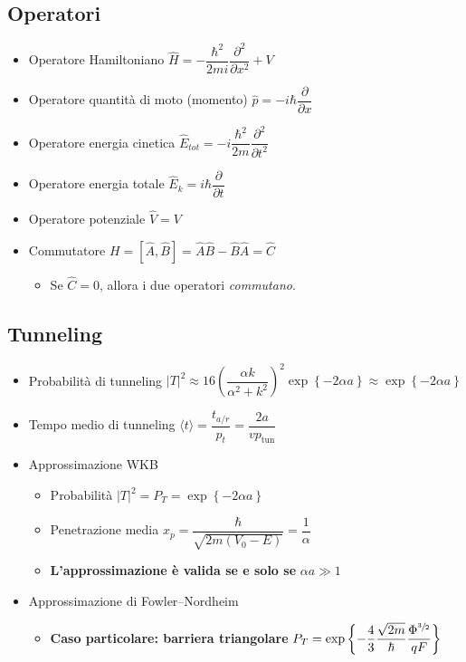 \documentclass{article}
\begin{document}
\subsection{Operatori}
\begin{itemize}
  \item Operatore Hamiltoniano \( \hat{H} = - \dfrac{\hbar ^ 2}{2mi} \dfrac{\partial ^ 2}{\partial x ^ 2} + V \)
  \item Operatore quantità di moto (momento) \( \hat{p} = -i \hbar \dfrac{\partial}{\partial x} \)
  \item Operatore energia cinetica \( \hat{E}_{tot} = -i \dfrac{\hbar ^ 2}{2m} \dfrac{\partial ^ 2}{\partial t ^ 2} \)
  \item Operatore energia totale \( \hat{E}_k = i \hbar \dfrac{\partial }{\partial t} \)
  \item Operatore potenziale \( \hat{V} = V \)
  \item Commutatore \( H = [\hat{A}, \hat{B}] = \hat{A}\hat{B} - \hat{B}\hat{A} = \hat{C} \)
        \begin{itemize}
          \item Se \( \hat{C} = 0 \), allora i due operatori \textit{commutano}.
        \end{itemize}
\end{itemize}

\subsection{Tunneling}
\begin{itemize}
  \item Probabilità di tunneling \( \left| T \right| ^ 2 \approx 16 \left( \dfrac{\alpha k}{\alpha^2 + k^2} \right) ^ 2  \exp{ \left\{ -2 \alpha a \right\} } \approx \exp{\left\{-2 \alpha a\right\}} \)
  \item Tempo medio di tunneling \( \langle t \rangle = \dfrac{t_{a/r}}{p_t} = \dfrac{2 a}{v p_{\text{tun}}} \)
  \item Approssimazione WKB
        \begin{itemize}
          \item Probabilità \( \left| T \right| ^ 2 = P_T = \exp{ \left\{ -2 \alpha a \right\} } \)
          \item Penetrazione media \( x_p = \dfrac{\hbar}{\sqrt{2 m (V_0 - E)}} = \dfrac{1}{\alpha} \)
          \item \textbf{L'approssimazione è valida se e solo se} \( \alpha a \gg 1 \)
        \end{itemize}
  \item Approssimazione di Fowler–Nordheim
        \begin{itemize}
          \item \textbf{Caso particolare: barriera triangolare} \( P_T = \exp\left\{ - \dfrac{4}{3} \dfrac{\sqrt{2 m}}{\hbar}  \dfrac{\Phi ^ {\sfrac{3}{2}}}{qF} \right\} \)
        \end{itemize}
\end{itemize}
\end{document}
